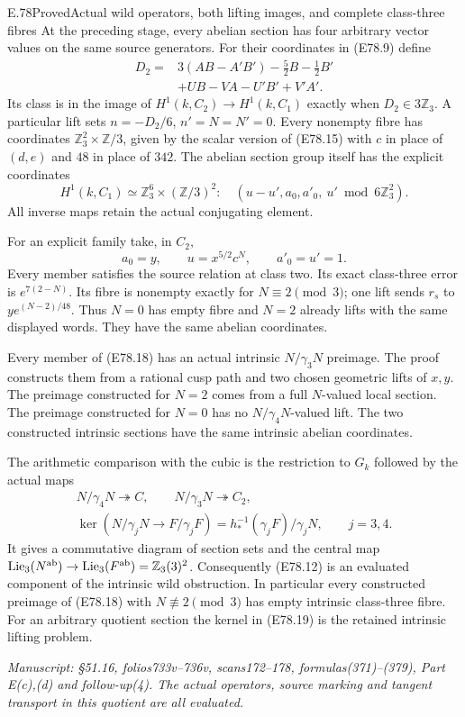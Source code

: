 \begin{statement}{E.78}{Proved}{Actual wild operators, both lifting images, and complete class-three fibres}
At the preceding stage, every abelian section has four
arbitrary vector values on the same source generators.
For their coordinates in (E78.9) define
\[
 \begin{aligned}
 D_2={}&3(AB-A'B')-\tfrac52B-\tfrac12B'\\
       &+UB-VA-U'B'+V'A'.
 \end{aligned}
 \tag{E78.16}
\]
Its class is in the image of
$H^1(k,C_2)\to H^1(k,C_1)$ exactly when
$D_2\in3\mathbb Z_3$.
A particular lift sets $n=-D_2/6$, $n'=N=N'=0$.
Every nonempty fibre has coordinates
$\mathbb Z_3^2\times\mathbb Z/3$, given by the scalar
version of (E78.15) with $c$ in place of $(d,e)$
and $48$ in place of $342$.
The abelian section group itself has the explicit
coordinates
\[
 H^1(k,C_1)\simeq\mathbb Z_3^6\times(\mathbb Z/3)^2:
 \quad(u-u',a_0,a'_0,\ u'\bmod6\mathbb Z_3^2).
 \tag{E78.17}
\]
All inverse maps retain the actual conjugating element.

For an explicit family take, in $C_2$,
\[
        a_0=y,\qquad u=x^{5/2}c^N,\qquad
        a'_0=u'=1.
 \tag{E78.18}
\]
Every member satisfies the source relation at class two.
Its exact class-three error is $e^{7(2-N)}$.
Its fibre is nonempty exactly for $N\equiv2\pmod3$;
one lift sends $r_s$ to $y e^{(N-2)/48}$.
Thus $N=0$ has empty fibre and $N=2$ already lifts
with the same displayed words. They have the same
abelian coordinates.

Every member of (E78.18) has an actual intrinsic
$N/\gamma_3N$ preimage. The proof constructs them
from a rational cusp path and two chosen geometric
lifts of $x,y$. The preimage constructed for $N=2$
comes from a full $N$-valued local section.
The preimage constructed for $N=0$ has no
$N/\gamma_4N$-valued lift. The two constructed
intrinsic sections have the same intrinsic
abelian coordinates.

The arithmetic comparison with the cubic is the
restriction to $G_k$ followed by the actual maps
\[
 \begin{gathered}
 N/\gamma_4N\twoheadrightarrow C,\qquad
 N/\gamma_3N\twoheadrightarrow C_2,\\
 \ker(N/\gamma_jN\to F/\gamma_jF)
       =h_*^{-1}(\gamma_jF)/\gamma_jN,\qquad j=3,4.
 \end{gathered}
 \tag{E78.19}
\]
It gives a commutative diagram of section sets and
the central map
$\operatorname{Lie}_3(N^{\rm ab})\to
  \operatorname{Lie}_3(F^{\rm ab})=\mathbb Z_3(3)^2$.
Consequently (E78.12) is an evaluated component of
the intrinsic wild obstruction. In particular every
constructed preimage of (E78.18) with
$N\not\equiv2\pmod3$ has empty intrinsic
class-three fibre. For an arbitrary quotient section
the kernel in (E78.19) is the retained intrinsic
lifting problem.

\emph{Manuscript: \S51.16, folios733v--736v,
scans172--178, formulas(371)--(379), Part E(c),(d)
and follow-up(4). The actual operators, source
marking and tangent transport in this quotient
are all evaluated.}
\end{statement}

